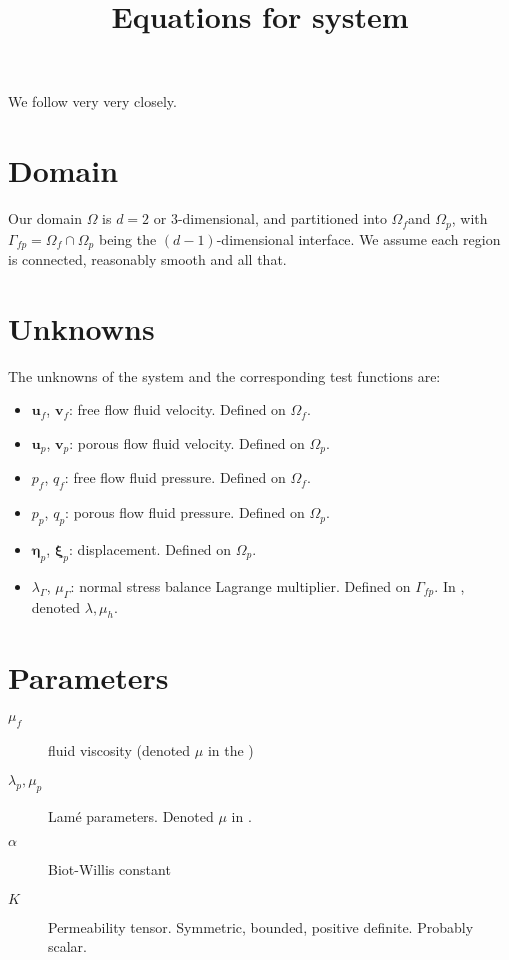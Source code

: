 \documentclass{article}
\newcommand{\stokes}{\ensuremath{\Omega_{f}}}
\newcommand{\darcy}{\ensuremath{\Omega_{p}}}
\newcommand{\interface}{\ensuremath{\Gamma_{fp}}}
\newcommand{\uf}{\ensuremath{\mathbf{u}_f}}
\newcommand{\vf}{\ensuremath{\mathbf{v}_f}}
\newcommand{\up}{\ensuremath{\mathbf{u}_p}}
\newcommand{\vp}{\ensuremath{\mathbf{v}_p}}
\newcommand{\pf}{\ensuremath{p_f}}
\newcommand{\pp}{\ensuremath{p_p}}
\newcommand{\qf}{\ensuremath{q_f}}
\newcommand{\qp}{\ensuremath{q_p}}
\newcommand{\disp}{\ensuremath{\boldsymbol{\eta}_p}}
\newcommand{\disptest}{\ensuremath{\boldsymbol{\xi}_p}}
\newcommand{\mult}{\ensuremath{\lambda_{\Gamma}}}
\newcommand{\multtest}{\ensuremath{\mu_{\Gamma}}}
\begin{document}
\title{Equations for system}
\maketitle


We follow \cite{ambartsumyan} very very closely.

\section{Domain}
Our domain $\Omega$ is $d=2 \text{ or } 3$-dimensional, and partitioned into \stokes and \darcy, with $\interface = \stokes \cap \darcy$ being the $(d-1)$-dimensional interface. We assume each region is connected, reasonably smooth and all that.

\section{Unknowns}
The unknowns of the system and the corresponding test functions are:

\begin{itemize}
\item \uf, \vf : free flow fluid velocity. Defined on \stokes.
\item \up, \vp : porous flow fluid velocity. Defined on \darcy.
\item \pf, \qf : free flow fluid pressure. Defined on \stokes.
\item \pp, \qp : porous flow fluid pressure. Defined on \darcy.
\item \disp, \disptest : displacement. Defined on \darcy.
\item \mult, \multtest : normal stress balance Lagrange multiplier. Defined on \interface. In \cite{ambartsumyan}, denoted $\lambda, \mu_h$.

\end{itemize}

\section{Parameters}

\begin{description}
\item[$\mu_f$] fluid viscosity (denoted $\mu$ in the \cite{ambartsumyan})
  
\item[$\lambda_p, \mu_p$] Lamé parameters. Denoted $\mu$ in \cite{ambartsumyan}.
\item[$\alpha$] Biot-Willis constant
\item[$K$] Permeability tensor. Symmetric, bounded, positive definite. Probably scalar.
\end{description}
\end{document}
